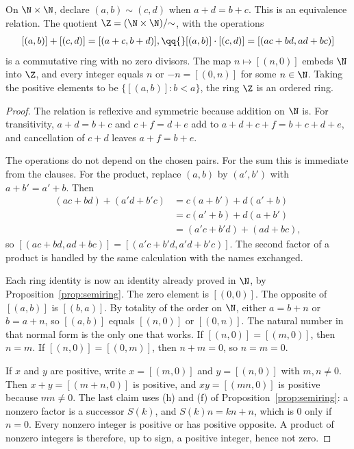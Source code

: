 \begin{proposition}\label{prop:integers}
On $\N\times\N$, declare $(a,b)\sim(c,d)$ when $a+d=b+c$. This is an equivalence relation. The quotient $\Z=(\N\times\N)/{\sim}$, with the operations
\[
\begin{gathered}[(a,b)]+[(c,d)]=[(a+c,b+d)],\qq{}[(a,b)]\cdot[(c,d)]=[(ac+bd,ad+bc)]\end{gathered}
\]
is a commutative ring with no zero divisors. The map $n\mapsto[(n,0)]$ embeds $\N$ into $\Z$, and every integer equals $n$ or $-n=[(0,n)]$ for some $n\in\N$. Taking the positive elements to be $\{[(a,b)]:b<a\}$, the ring $\Z$ is an ordered ring.
\end{proposition}
\begin{proof}
The relation is reflexive and symmetric because addition on $\N$ is. For transitivity, $a+d=b+c$ and $c+f=d+e$ add to $a+d+c+f=b+c+d+e$, and cancellation of $c+d$ leaves $a+f=b+e$.

The operations do not depend on the chosen pairs. For the sum this is immediate from the clauses. For the product, replace $(a,b)$ by $(a',b')$ with $a+b'=a'+b$. Then
\[
\begin{aligned}(ac+bd)+(a'd+b'c)&=c(a+b')+d(a'+b)\\&=c(a'+b)+d(a+b')\\&=(a'c+b'd)+(ad+bc),\end{aligned}
\]
so $[(ac+bd,ad+bc)]=[(a'c+b'd,a'd+b'c)]$. The second factor of a product is handled by the same calculation with the names exchanged.

Each ring identity is now an identity already proved in $\N$, by Proposition~\ref{prop:semiring}. The zero element is $[(0,0)]$. The opposite of $[(a,b)]$ is $[(b,a)]$. By totality of the order on $\N$, either $a=b+n$ or $b=a+n$, so $[(a,b)]$ equals $[(n,0)]$ or $[(0,n)]$. The natural number in that normal form is the only one that works. If $[(n,0)]=[(m,0)]$, then $n=m$. If $[(n,0)]=[(0,m)]$, then $n+m=0$, so $n=m=0$.

If $x$ and $y$ are positive, write $x=[(m,0)]$ and $y=[(n,0)]$ with $m,n\ne 0$. Then $x+y=[(m+n,0)]$ is positive, and $xy=[(mn,0)]$ is positive because $mn\ne 0$. The last claim uses (h) and (f) of Proposition~\ref{prop:semiring}: a nonzero factor is a successor $S(k)$, and $S(k)n=kn+n$, which is $0$ only if $n=0$. Every nonzero integer is positive or has positive opposite. A product of nonzero integers is therefore, up to sign, a positive integer, hence not zero.
\end{proof}

